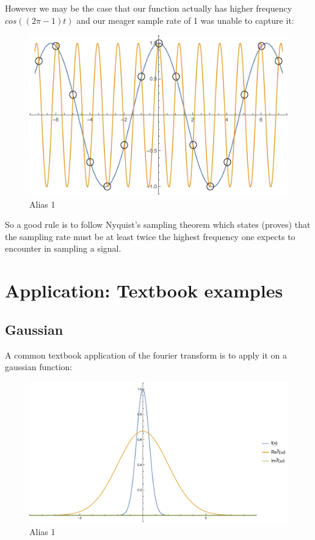 \documentclass[titlepage]{article}
\begin{document}
However we may be the case that our function actually has higher frequency $cos((2\pi-1)t)$ and our meager sample rate of 1 was unable to capture it:

\begin{figure}[ht]
\centering
\includegraphics[scale = 0.5, center]{images/alias3.png}
\caption{Alias 1}
\label{fig:2d}
\end{figure}
\FloatBarrier

So a good rule is to follow Nyquist's sampling theorem which states (proves) that the sampling rate must be at least twice the highest frequency one expects to encounter in sampling a signal.

\section{Application: Textbook examples}
\subsection{Gaussian}
A common textbook application of the fourier transform is to apply it on a gaussian function:

\begin{figure}[ht]
\centering
\includegraphics[scale=0.8,center]{images/gaussian1.pdf}
\caption{Alias 1}
\label{fig:2d}
\end{figure}
\FloatBarrier
\end{document}
